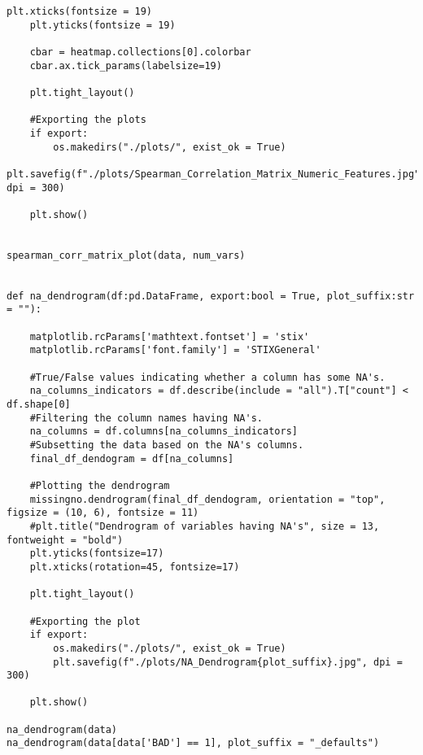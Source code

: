 \begin{lstlisting}[basicstyle=\footnotesize\ttfamily]
    plt.xticks(fontsize = 19)
    plt.yticks(fontsize = 19)

    cbar = heatmap.collections[0].colorbar
    cbar.ax.tick_params(labelsize=19)
    
    plt.tight_layout()

    #Exporting the plots
    if export:
        os.makedirs("./plots/", exist_ok = True)
        plt.savefig(f"./plots/Spearman_Correlation_Matrix_Numeric_Features.jpg", dpi = 300)
    
    plt.show()


spearman_corr_matrix_plot(data, num_vars)


def na_dendrogram(df:pd.DataFrame, export:bool = True, plot_suffix:str = ""):

    matplotlib.rcParams['mathtext.fontset'] = 'stix'
    matplotlib.rcParams['font.family'] = 'STIXGeneral'

    #True/False values indicating whether a column has some NA's.
    na_columns_indicators = df.describe(include = "all").T["count"] < df.shape[0]
    #Filtering the column names having NA's.
    na_columns = df.columns[na_columns_indicators]
    #Subsetting the data based on the NA's columns.
    final_df_dendogram = df[na_columns]

    #Plotting the dendrogram
    missingno.dendrogram(final_df_dendogram, orientation = "top", figsize = (10, 6), fontsize = 11)
    #plt.title("Dendrogram of variables having NA's", size = 13, fontweight = "bold")
    plt.yticks(fontsize=17)
    plt.xticks(rotation=45, fontsize=17)

    plt.tight_layout()

    #Exporting the plot
    if export:
        os.makedirs("./plots/", exist_ok = True)
        plt.savefig(f"./plots/NA_Dendrogram{plot_suffix}.jpg", dpi = 300)
    
    plt.show()

na_dendrogram(data)
na_dendrogram(data[data['BAD'] == 1], plot_suffix = "_defaults")
\end{lstlisting}

